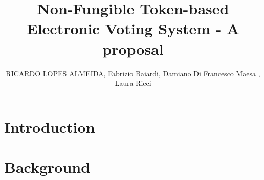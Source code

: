 \documentclass{ieeeaccess}
\begin{document}

\title{Non-Fungible Token-based Electronic Voting System - A proposal}
\author{\uppercase{Ricardo Lopes Almeida},
    Fabrizio Baiardi, Damiano Di Francesco Maesa
    ,
    Laura Ricci }

\address[1]{Universit\'a di Camerino, 62032 MC, Camerino, Italy (e-mail: ricardo.almeida@unicam.it)}
\address[2]{Dipartimento di Informatica, Universit\'a di Pisa, 56127 PI, Pisa, Italy}




\begin{abstract}
\end{abstract}

\begin{keywords}
\end{keywords}

\titlepgskip=-21pt

\maketitle

\section{Introduction}
\label{sec:introduction}


\section{Background}
\label{background}

% 
\label{cryptographic_methods}

\twocolumn
\end{document}
